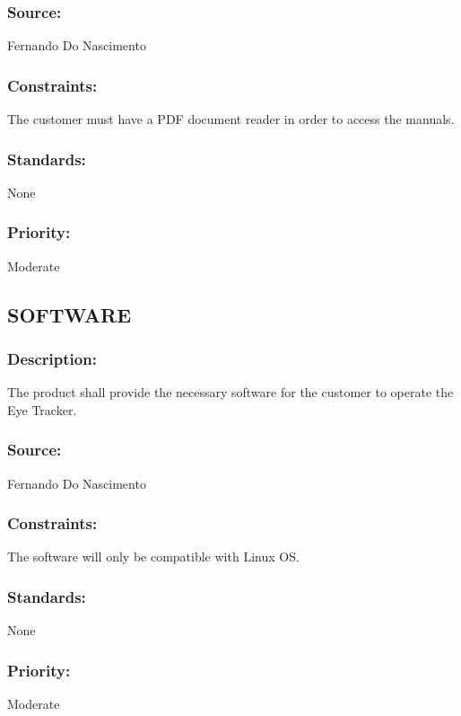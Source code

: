 \subsubsection{Source:} 
	{Fernando Do Nascimento}
\subsubsection{Constraints:} 
{The customer must have a PDF document reader in order to access the manuals.}
\subsubsection{Standards:} 
{None}
\subsubsection{Priority:} 
	{Moderate}

\subsection{\text SOFTWARE}
\subsubsection{Description:} 
	{The product shall provide the necessary software for the customer to operate the Eye Tracker.}
\subsubsection{Source:} 
{Fernando Do Nascimento}
\subsubsection{Constraints:} 
{The software will only be compatible with Linux OS.}
\subsubsection{Standards:} 
{None}
\subsubsection{Priority:} {Moderate}
